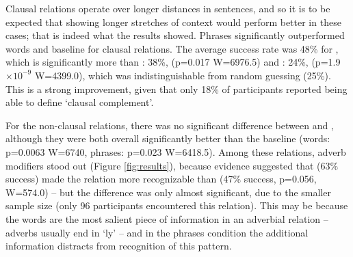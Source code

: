 Clausal relations operate over longer distances in sentences, and so it is to be expected that showing longer stretches of context would perform better in these cases; that is indeed what the results showed.
Phrases significantly outperformed words and baseline for clausal relations. The average success rate was 48\% for , which is significantly more than : 38\%, (p=0.017 W=6976.5) and : 24\%, (p=1.9$\times 10^{-9}$ W=4399.0), which was indistinguishable from random guessing (25\%). This is a  strong improvement, given that only 18\% of participants reported being able to define  `clausal complement'.

For the non-clausal relations, there was no significant difference between  and , although they were both overall significantly better than the baseline (words: p=0.0063 W=6740, phrases: p=0.023 W=6418.5). Among these relations, adverb modifiers stood out (Figure \ref{fig:results}), because evidence suggested that  (63\% success) made the relation more recognizable than  (47\% success, p=0.056, W=574.0) -- but the difference was only almost significant, due to the smaller sample size (only 96 participants encountered this relation). This may be because the words are the most salient piece of information in an adverbial relation -- adverbs usually end in `ly' -- and in the phrases condition the additional information distracts from recognition of this pattern.

